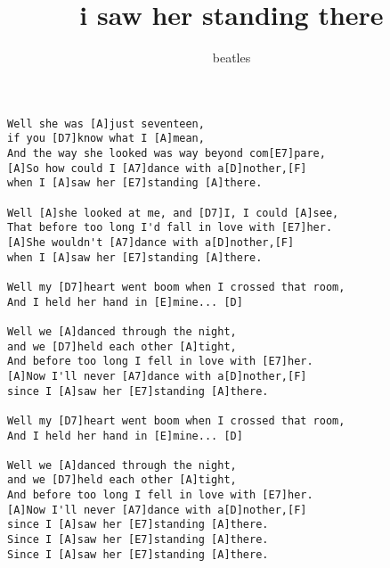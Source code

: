 \author{beatles}
\title{i saw her standing there}
\maketitle
\begin{verbatim}
Well she was [A]just seventeen,
if you [D7]know what I [A]mean,
And the way she looked was way beyond com[E7]pare,
[A]So how could I [A7]dance with a[D]nother,[F]
when I [A]saw her [E7]standing [A]there.

Well [A]she looked at me, and [D7]I, I could [A]see, 
That before too long I'd fall in love with [E7]her.
[A]She wouldn't [A7]dance with a[D]nother,[F]
when I [A]saw her [E7]standing [A]there.

Well my [D7]heart went boom when I crossed that room,
And I held her hand in [E]mine... [D]

Well we [A]danced through the night,
and we [D7]held each other [A]tight,
And before too long I fell in love with [E7]her.
[A]Now I'll never [A7]dance with a[D]nother,[F]
since I [A]saw her [E7]standing [A]there.

Well my [D7]heart went boom when I crossed that room,
And I held her hand in [E]mine... [D]

Well we [A]danced through the night,
and we [D7]held each other [A]tight,
And before too long I fell in love with [E7]her.
[A]Now I'll never [A7]dance with a[D]nother,[F]
since I [A]saw her [E7]standing [A]there.
Since I [A]saw her [E7]standing [A]there.
Since I [A]saw her [E7]standing [A]there.
\end{verbatim}